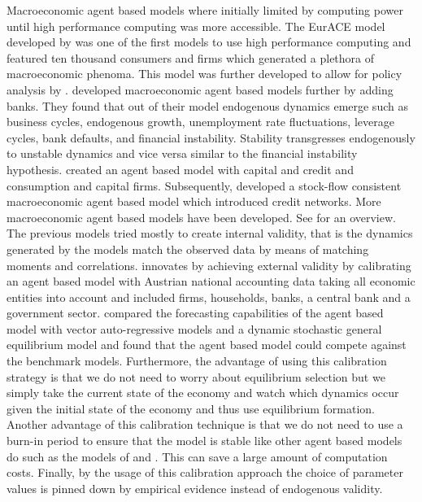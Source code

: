 Macroeconomic agent based models where initially limited by computing power until high performance computing was more accessible. The EurACE model developed by \cite{deissenberg_eurace_2008} was one of the first models to use high performance computing and featured ten thousand consumers and firms which generated a plethora of macroeconomic phenoma. This model was further developed to allow for policy analysis by \cite{dawid_euraceunibi_2012}.
\cite{riccetti_agent_2015}  developed macroeconomic agent based models further by adding banks. They found that out of their model endogenous dynamics emerge such as business cycles, endogenous growth, unemployment rate fluctuations, leverage cycles, bank defaults, and financial instability. Stability transgresses endogenously to unstable dynamics and vice versa similar to the \cite{minsky_financial_1999} financial instability hypothesis. \cite{assenza_emergent_2015} created an agent based model with capital and credit and consumption and capital firms. Subsequently, \cite{caiani_agent_2016} developed a stock-flow consistent macroeconomic agent based model which introduced credit networks. More macroeconomic agent based models have been developed. See \cite{dawid_agent-based_2018} for an overview.\\

The previous models tried mostly to create internal validity, that is the dynamics generated by the models match the observed data by means of matching moments and correlations. \cite{poledna_economic_2019} innovates by achieving external validity by calibrating an agent based model with Austrian national accounting data taking all economic entities into account and included firms, households, banks, a central bank and a government sector. \cite{poledna_economic_2019} compared the forecasting capabilities of the agent based model with vector auto-regressive models and a dynamic stochastic general equilibrium model and found that the agent based model could compete against the benchmark models. Furthermore, the advantage of using this calibration strategy is that we do not need to worry about equilibrium selection but we simply take the current state of the economy and watch which dynamics occur given the initial state of the economy and thus use equilibrium formation. Another advantage of this calibration technique is that we do not need to use a burn-in period to ensure that the model is stable like other agent based models do such as the models of \cite{caiani_agent_2016} and \cite{riccetti_agent_2015}. This can save a large amount of computation costs. Finally, by the usage of this calibration approach the choice of parameter values is pinned down by empirical evidence instead of endogenous validity.